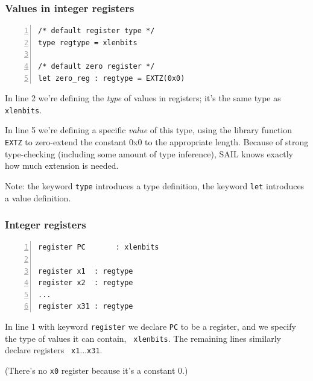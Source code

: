 \documentclass[aspectratio=169]{beamer}
\newcommand{\slidefont}{\scriptsize}
\newcommand{\cf}{\scriptsize\tt}
\begin{document}
\begin{frame}[fragile]
  \frametitle{Values in integer registers}

  \slidefont

  \begin{Verbatim}[frame=single, numbers=left, label = File riscv\_reg\_type.sail]
/* default register type */
type regtype = xlenbits

/* default zero register */
let zero_reg : regtype = EXTZ(0x0)
  \end{Verbatim}

  \begin{minipage}{\textwidth}
    In line 2 we're defining the \emph{type} of values in registers;
    it's the same type as {\cf xlenbits}.

    \vspace{1ex}

    In line 5 we're defining a specific \emph{value} of this type,
    using the library function {\cf EXTZ} to zero-extend the constant
    0x0 to the appropriate length.  Because of strong type-checking
    (including some amount of type inference), SAIL knows exactly how
    much extension is needed.

    \vspace{1ex}

    Note: the keyword {\cf type} introduces a type definition, the
    keyword {\cf let} introduces a value definition.
  \end{minipage}

\end{frame}


\begin{frame}[fragile]
  \frametitle{Integer registers}

  \slidefont

  \begin{Verbatim}[frame=single, numbers=left, label = File riscv\_regs.sail]
register PC       : xlenbits

register x1  : regtype
register x2  : regtype
...
register x31 : regtype
  \end{Verbatim}

  \begin{minipage}{\textwidth}
    In line 1 with keyword {\cf register} we declare {\cf PC} to be a
    register, and we specify the type of values it can contain, {\cf
      xlenbits}.  The remaining lines similarly declare registers {\cf
      x1}...{\cf x31}.

    \vspace{1ex}

    (There's no {\cf x0} register because it's a constant 0.)

  \end{minipage}

\end{frame}
\end{document}

